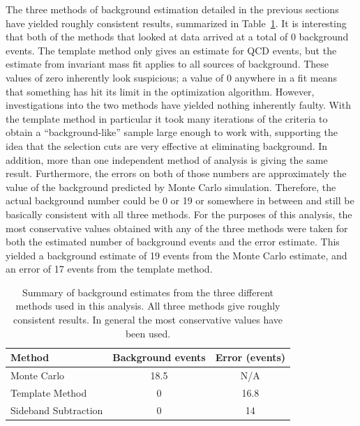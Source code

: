 The three methods of background estimation 
detailed in the previous sections have yielded 
roughly consistent results, 
summarized in Table~\ref{TableBGSub}.  
It is interesting that both of the methods 
that looked at data arrived at a total 
of 0 background events.  
The template method only gives an estimate for 
QCD events, 
but the estimate from invariant mass fit 
applies to all sources of background.  
These values of zero inherently look suspicious; 
a value of 0 anywhere in a fit 
means that something 
has hit its limit in the optimization 
algorithm.  
However, investigations into the two methods 
have yielded nothing inherently faulty.  
With the template method in particular 
it took many iterations of the criteria 
to obtain a ``background-like'' sample 
large enough to work with, 
supporting the idea that the selection 
cuts are very effective at eliminating background.  
In addition, more than one independent 
method of analysis is giving the same result.  
Furthermore, the errors on both of those numbers 
are approximately the value of the background 
predicted by Monte Carlo simulation.  
Therefore, the actual background number 
could be 0 or 19 or somewhere in between 
and still be basically consistent with 
all three methods.  
For the purposes of this analysis, 
the most conservative values obtained 
with any of the three methods were 
taken for both the estimated number 
of background events and the error estimate.  
This yielded a background estimate of 
19 events from the Monte Carlo estimate, 
and an error of 17 events from the template method.  

\begin{table}[htbp]
  \begin{center}
    \caption[Summary of background estimates from different methods]{
      Summary of background estimates from the three 
      different methods used in this analysis.  
      All three methods give roughly consistent results.  
      In general the most conservative values have been used.  
    }
    \label{TableBGSub}
    \begin{tabular}[]{ | l | c | c | }
      \hline
      Method & Background events & Error (events)  \\ \hline \hline
      Monte Carlo & 18.5 & N/A \\ \hline 
      Template Method & 0 & 16.8 \\ \hline 
      Sideband Subtraction & 0 & 14 \\ \hline 
    \end{tabular}
  \end{center}
\end{table}


